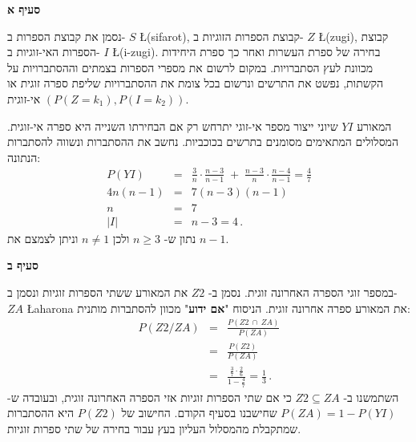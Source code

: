 \textbf{סעיף א}

נסמן את קבוצת הספרות ב-%
$S$ \L{(sifarot)},
קבוצת הספרות הזוגיות ב-%
$Z$ \L{(zugi)},
קבוצת הספרות האי-זוגיות ב-%
$I$ \L{(i-zugi)}.
בחירה של ספרת העשרות ואחר כך ספרת היחידות מכוונת לעץ הסתברויות. במקום לרשום את מספרי הספרות בצמתים וההסתברויות על הקשתות, נפשט את התרשים ונרשום בכל צומת את ההסתברויות שליפת ספרה זוגית או אי-זוגית
$(P(Z=k_1),P(I=k_2))$.

\begin{center}
\end{center}
המאורע
$YI$
שיוני ייצור מספר אי-זוגי יתרחש רק אם הבחירתו השנייה היא ספרה אי-זוגית. המסלולים המתאימים מסומנים בתרשים בכוכביות. נחשב את ההסתברות ונשווה להסתברות הנתונה:
\begin{eqnarray*}
P(YI)&=&\frac{3}{n}\cdot\frac{n-3}{n-1} \;+\; \frac{n-3}{n}\cdot\frac{n-4}{n-1} = \frac{4}{7}\\
4n(n-1)&=&7(n-3)(n-1)\\
n&=&7\\
|I|&=&n-3=4\,.
\end{eqnarray*}
נתון ש-%
$n\geq 3$
ולכן
$n\neq 1$
וניתן לצמצם את 
$n-1$.

\textbf{סעיף ב}

במספר זוגי הספרה האחרונה זוגית. נסמן ב-%
$Z2$
את המאורע ששתי הספרות זוגיות ונסמן ב-%
$ZA$ \L{aharona}
את המאורע ספרה אחרונה זוגית. הניסוח
"\textbf{אם ידוע}"
מכוון להסתברות מותנית:
\begin{eqnarray*}
P(Z2/ZA) &=& \frac{P(Z2\:\cap\:ZA)}{P(ZA)}\\
&=&\frac{P(Z2)}{P(ZA)}\\
&=&\frac{\frac{3}{7}\cdot\frac{2}{6}}{1-\frac{4}{7}}=\frac{1}{3}\,.
\end{eqnarray*}
השתמשנו ב-%
$Z2\subseteq ZA$ 
כי אם שתי הספרות זוגיות אזי הספרה האחרונה זוגית, ובעובדה ש-%
$P(ZA)=1-P(YI)$
שחישבנו בסעיף הקודם. החישוב של
$P(Z2)$
היא ההסתברות שמתקבלת מהמסלול העליון בעץ עבור בחירה של שתי ספרות זוגיות.

